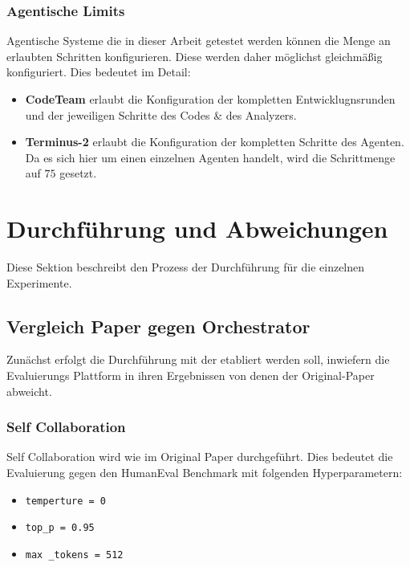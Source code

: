 \subsubsection{Agentische Limits}

Agentische Systeme die in dieser Arbeit getestet werden können die Menge an erlaubten Schritten konfigurieren. Diese werden daher möglichst gleichmäßig konfiguriert. Dies bedeutet im Detail:

\begin{itemize}
    \item \textbf{CodeTeam} erlaubt die Konfiguration der kompletten Entwicklugnsrunden und der jeweiligen Schritte des Codes \& des Analyzers. \\ 
    \item \textbf{Terminus-2} erlaubt die Konfiguration der kompletten Schritte des Agenten. Da es sich hier um einen einzelnen Agenten handelt, wird die Schrittmenge auf $75$\todo{!} gesetzt.
\end{itemize}

\section{Durchführung und Abweichungen}\label{ch:Durchführung und Abweichungen}

Diese Sektion beschreibt den Prozess der Durchführung für die einzelnen Experimente.

\subsection{Vergleich Paper gegen Orchestrator}

Zunächst erfolgt die Durchführung mit der etabliert werden soll, inwiefern die Evaluierungs Plattform in ihren Ergebnissen von denen der Original-Paper abweicht.

\subsubsection{Self Collaboration}

Self Collaboration wird wie im Original Paper \cite{dongSelfCollaborationCodeGeneration2024} durchgeführt. Dies bedeutet die Evaluierung gegen den HumanEval Benchmark mit folgenden Hyperparametern:

\begin{itemize}
    \item \texttt{temperture = 0}
    \item \texttt{top\_p = 0.95}
    \item \texttt{max \_tokens = 512}
\end{itemize}

